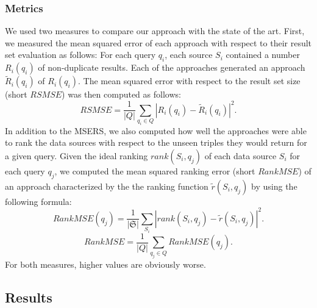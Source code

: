 \documentclass{sig-alternate}  %
\begin{document}
\subsubsection{Metrics}
We used two measures to compare our approach with the state of the art.
First, we measured the mean squared error of each approach with respect to their result set evaluation as follows:
For each query $q_i$, each source $S_i$ contained a number $R_i(q_i)$ of non-duplicate results.
Each of the approaches generated an approach $\tilde{R}_i(q_i)$ of $R_i(q_i)$.
The mean squared error with respect to the result set size (short $RSMSE$) was then computed as follows:
\begin{equation}
RSMSE = \frac{1}{|Q|}\sum\limits_{q_i \in Q}|R_i(q_i) - \tilde{R}_i(q_i)|^2.
\end{equation}
In addition to the MSERS, we also computed how well the approaches were able to rank the data sources with respect to the unseen triples they would return for a given query.
Given the ideal ranking $rank(S_i, q_j)$ of each data source $S_i$ for each query $q_j$, we computed the mean squared ranking error (short $RankMSE$) of an approach characterized by the the ranking function $\tilde{r}(S_i, q_j)$ by using the following formula:
\begin{equation}
RankMSE (q_j) = \frac{1}{|\mathfrak{S}|}\sum\limits_{S_i}|rank(S_i, q_j) - \tilde{r}(S_i, q_j)|^2.
\end{equation}
\begin{equation}
RankMSE  = \frac{1}{|Q|}\sum\limits_{q_j  \in Q}RankMSE(q_j).
\end{equation}
For both measures, higher values are obviously worse.


\subsection{Results}
\end{document}
